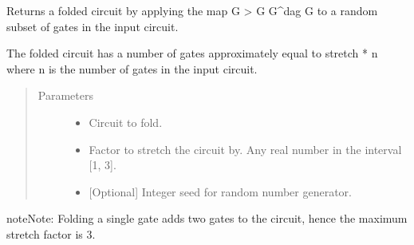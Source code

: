 \documentclass[letterpaper,10pt,english]{sphinxmanual}
\begin{document}

\begin{fulllineitems}
\label{\detokenize{apidoc:mitiq.folding_cirq.fold_gates_at_random}}
Returns a folded circuit by applying the map G \sphinxhyphen{}\textgreater{} G G\textasciicircum{}dag G to a random subset of gates in the input circuit.

The folded circuit has a number of gates approximately equal to stretch * n where n is the number of gates in
the input circuit.
\begin{quote}\begin{description}
\item[{Parameters}] \leavevmode\begin{itemize}
\item {} 
 \sphinxhyphen{}\sphinxhyphen{} Circuit to fold.

\item {} 
 \sphinxhyphen{}\sphinxhyphen{} Factor to stretch the circuit by. Any real number in the interval {[}1, 3{]}.

\item {} 
 \sphinxhyphen{}\sphinxhyphen{} {[}Optional{]} Integer seed for random number generator.

\end{itemize}

\end{description}\end{quote}

\begin{sphinxadmonition}{note}{Note:}
Folding a single gate adds two gates to the circuit, hence the maximum stretch factor is 3.
\end{sphinxadmonition}

\end{fulllineitems}

\end{document}
